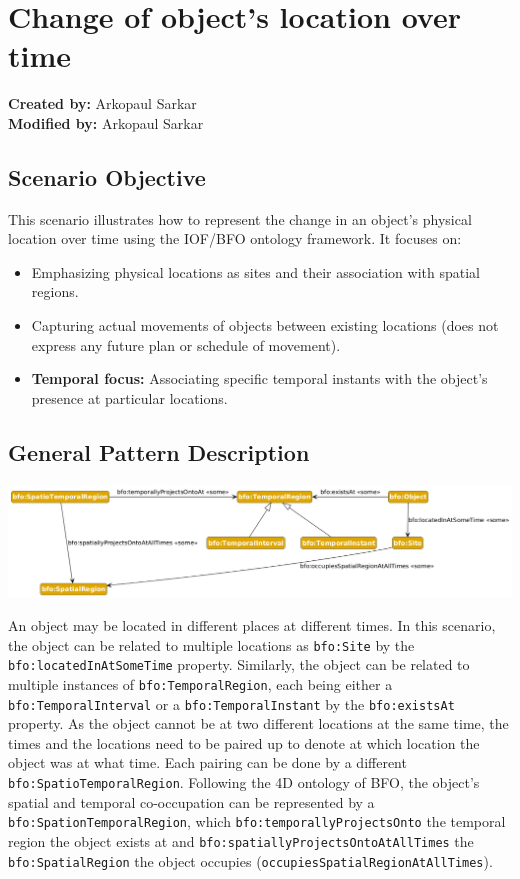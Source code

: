 \section{Change of object's location over time}
\label{sec-change-location}

\textbf{Created by:} Arkopaul Sarkar \\
\textbf{Modified by:} Arkopaul Sarkar \\

\subsection*{Scenario Objective}

This scenario illustrates how to represent the change in an object's physical location over time using the IOF/BFO ontology framework. It focuses on:
\begin{itemize}
    \item Emphasizing physical locations as sites and their association with spatial regions.
    \item Capturing actual movements of objects between existing locations (does not express any future plan or schedule of movement).
    \item \textbf{Temporal focus:} Associating specific temporal instants with the object's presence at particular locations.
\end{itemize}

\subsection*{General Pattern Description}
\includegraphics[scale=0.38]{scenarios/location-change/images/change-of-location-general.png}

An object may be located in different places at different times. In this scenario, the object can be related to multiple locations as \texttt{bfo:Site} by the \texttt{bfo:locatedInAtSomeTime} property. Similarly, the object can be related to multiple instances of \texttt{bfo:TemporalRegion}, each being either a \texttt{bfo:TemporalInterval} or a \texttt{bfo:TemporalInstant} by the \texttt{bfo:existsAt} property. As the object cannot be at two different locations at the same time, the times and the locations need to be paired up to denote at which location the object was at what time. Each pairing can be done by a different \texttt{bfo:SpatioTemporalRegion}. Following the 4D ontology of BFO, the object's spatial and temporal co-occupation can be represented by a \texttt{bfo:SpationTemporalRegion}, which \texttt{bfo:temporallyProjectsOnto} the temporal region the object exists at and \texttt{bfo:spatiallyProjectsOntoAtAllTimes} the \texttt{bfo:SpatialRegion} the object occupies (\texttt{occupiesSpatialRegionAtAllTimes}). 


